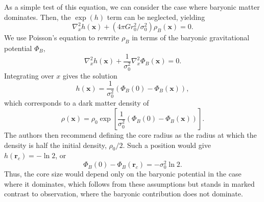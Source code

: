 As a simple test of this equation, we can consider the case where
baryonic matter dominates. Then, the $\exp(h)$ term can be neglected,
yielding
\begin{equation}
\nabla_x^2 h(\mathbf{x}) + (4\pi G r_0^2/\sigma_0^2) \rho_B(\mathbf{x}) = 0.
\end{equation}
We use Poisson's equation to rewrite $\rho_B$ in terms of the baryonic
gravitational potential $\Phi_B$,
\begin{equation}
\nabla_x^2 h(\mathbf{x}) + \frac{1}{\sigma_0^2} \nabla_x^2 \Phi_B(\mathbf{x}) = 0.
\end{equation}
Integrating over $x$ gives the solution 
\begin{equation}
h(\mathbf{x}) = \frac{1}{\sigma_0^2} \left(\Phi_B(0) - \Phi_B(\mathbf{x})\right),
\end{equation}
which corresponds to a dark matter density of 
\begin{equation}
\rho(\mathbf{x}) = \rho_0 \exp\left[\frac{1}{\sigma_0^2} 
\left(\Phi_B(0) - \Phi_B(\mathbf{x})\right) \right].
\end{equation}
The authors then recommend defining the core radius as the radius at
which the density is half the initial density, \(\rho_0 / 2\). Such a position
would give \(h(\mathbf{r}_c) = -\ln 2\), or
\begin{equation}
\Phi_B(0) - \Phi_B(\mathbf{r}_c) = -\sigma_0^2 \ln 2.
\end{equation}
Thus, the core size would depend only on the baryonic potential in the case
where it dominates, which follows from these assumptions but stands in marked
contrast to observation, where the baryonic contribution does not dominate.

